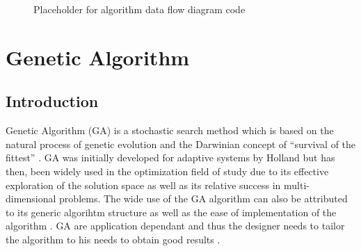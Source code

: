 \begin{figure}[htbp!]
	\centering
	\setlength \fboxsep{0pt}
	\setlength \fboxrule{0.5pt}
	\caption{Placeholder for algorithm data flow diagram code}
	\label{fig:SAFlowDiagram}
\end{figure}
\section{Genetic Algorithm}
\subsection{Introduction}
Genetic Algorithm (GA) is a stochastic search method which is based on the natural process of genetic evolution and the Darwinian concept of ``survival of the fittest'' \cite{DistributedHierarchicalGA,AcceleratingGA,AdaptiveSAGA,FamilyGA}. GA was initially developed for adaptive systems by Holland but has then, been widely used in the optimization field of study due to its effective exploration of the solution space as well as its relative success in multi-dimensional problems\cite{ParallelGASA,DistributedHierarchicalGA,FamilyGA}. The wide use of the GA algorithm can also be attributed to its generic algorihtm structure as well as the ease of implementation of the algorithm \cite{FamilyGA,AdaptiveSAGA}. GA are application dependant and thus the designer needs to tailor the algorithm to his needs to obtain good results \cite{AcceleratingGA}.

